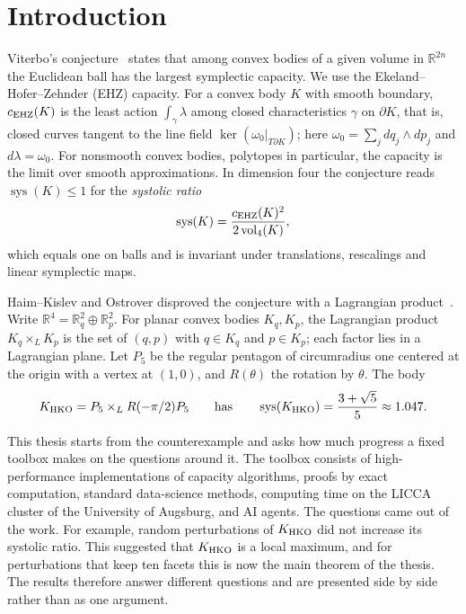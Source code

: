 \section{Introduction}\label{sec:introduction}

Viterbo's conjecture~\cite{Viterbo2000} states that among convex bodies of a
given volume in $\mathbb R^{2n}$ the Euclidean ball has the largest symplectic
capacity. We use the Ekeland--Hofer--Zehnder (EHZ) capacity. For a convex body
$K$ with smooth boundary, $c_{\rm EHZ}(K)$ is the least action
$\int_\gamma\lambda$ among closed characteristics $\gamma$ on $\partial K$,
that is, closed curves tangent to the line field $\ker(\omega_0|_{T\partial K})$;
here $\omega_0=\sum_j dq_j\wedge dp_j$ and $d\lambda=\omega_0$. For nonsmooth
convex bodies, polytopes in particular, the capacity is the limit over smooth
approximations. In dimension four the conjecture reads
$\operatorname{sys}(K)\le 1$ for the \emph{systolic ratio}
\[
 \operatorname{sys}(K)=\frac{c_{\rm EHZ}(K)^2}{2\operatorname{vol}_4(K)},
\]
which equals one on balls and is invariant under translations, rescalings and
linear symplectic maps.

Haim--Kislev and Ostrover disproved the conjecture with a Lagrangian
product~\cite{HaimKislevOstrover2024}. Write
$\mathbb R^4=\mathbb R^2_q\oplus\mathbb R^2_p$. For planar convex bodies
$K_q,K_p$, the Lagrangian product $K_q\times_L K_p$ is the set of
$(q,p)$ with $q\in K_q$ and $p\in K_p$; each factor lies in a Lagrangian plane.
Let $P_5$ be the regular pentagon of circumradius one centered at the origin with
a vertex at $(1,0)$, and $R(\theta)$ the rotation by $\theta$. The body
\[
 K_{\rm HKO}=P_5\times_L R(-\pi/2)P_5
 \qquad\text{has}\qquad
 \operatorname{sys}(K_{\rm HKO})=\frac{3+\sqrt5}{5}\approx1.047.
\]

This thesis starts from the counterexample and asks how much progress a fixed
toolbox makes on the questions around it. The toolbox consists of high-performance
implementations of capacity algorithms, proofs by exact computation,
standard data-science methods, computing time on the LICCA cluster of the
University of Augsburg, and AI agents. The questions came out of the work. For
example, random perturbations of $K_{\rm HKO}$ did not increase its systolic
ratio. This suggested that $K_{\rm HKO}$ is a local maximum, and for
perturbations that keep ten facets this is now the main theorem of the thesis.
The results therefore answer different questions and are presented side by
side rather than as one argument.

